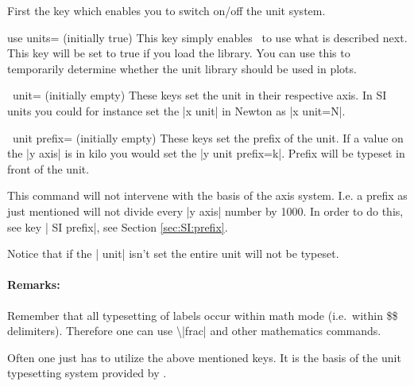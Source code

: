 First the key which enables you to switch on/off the unit system.
\begin{pgfplotskey}{use units= (initially true)}
  This key simply enables \PGFPlots\ to use what is described next. This key will be set to true if you load the library. You can use this to temporarily
  determine whether the unit library should be used in plots.
\end{pgfplotskey}
\begin{pgfplotsxykey}{\x\ unit= (initially empty)}
  These keys set the unit in their respective axis. In SI units you could for instance set the |x unit| in Newton as |x unit=N|.
\end{pgfplotsxykey}
\begin{pgfplotsxykey}{\x\ unit prefix= (initially empty)}
  These keys set the prefix of the unit. If a value on the |y axis| is in kilo you would set the |y unit prefix=k|. Prefix will be typeset in front of the unit.

  This command will not intervene with the basis of the axis system. I.e. a prefix as just mentioned will not divide every |y axis| number by 1000.
  In order to do this, see key | SI prefix|, see Section \ref{sec:SI:prefix}.

  Notice that if the | unit| isn't set the entire unit will not be typeset.

  \paragraph{Remarks:} Remember that all typesetting of labels occur within math mode (i.e.\ within \$\$ delimiters). Therefore one can use \textbackslash|frac|
  and other mathematics commands.
\end{pgfplotsxykey}
Often one just has to utilize the above mentioned keys. It is the basis of the unit typesetting system provided by \PGFPlots.
\begin{codeexample}[]
\end{codeexample}

